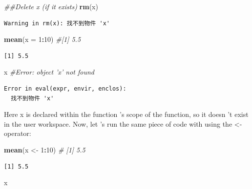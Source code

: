 \documentclass[]{book}
\newenvironment{Shaded}{\begin{snugshade}}{\end{snugshade}}
\newcommand{\CommentTok}[1]{\textcolor[rgb]{0.56,0.35,0.01}{\textit{#1}}}
\newcommand{\DataTypeTok}[1]{\textcolor[rgb]{0.13,0.29,0.53}{#1}}
\newcommand{\DecValTok}[1]{\textcolor[rgb]{0.00,0.00,0.81}{#1}}
\newcommand{\KeywordTok}[1]{\textcolor[rgb]{0.13,0.29,0.53}{\textbf{#1}}}
\newcommand{\NormalTok}[1]{#1}
\newcommand{\OperatorTok}[1]{\textcolor[rgb]{0.81,0.36,0.00}{\textbf{#1}}}
\newcommand{\StringTok}[1]{\textcolor[rgb]{0.31,0.60,0.02}{#1}}
\theoremstyle{definition}
\theoremstyle{definition}
\theoremstyle{definition}
\theoremstyle{remark}
\begin{document}
\begin{Shaded}
\begin{Highlighting}[]
\CommentTok{##Delete x (if it exists)}
\KeywordTok{rm}\NormalTok{(x)}
\end{Highlighting}
\end{Shaded}

\begin{verbatim}
Warning in rm(x): 找不到物件 'x'
\end{verbatim}

\begin{Shaded}
\begin{Highlighting}[]
\KeywordTok{mean}\NormalTok{(}\DataTypeTok{x =} \DecValTok{1}\OperatorTok{:}\DecValTok{10}\NormalTok{) }\CommentTok{#[1] 5.5}
\end{Highlighting}
\end{Shaded}

\begin{verbatim}
[1] 5.5
\end{verbatim}

\begin{Shaded}
\begin{Highlighting}[]
\NormalTok{x }\CommentTok{#Error: object 'x' not found}
\end{Highlighting}
\end{Shaded}

\begin{verbatim}
Error in eval(expr, envir, enclos):
  找不到物件 'x'
\end{verbatim}

Here x is declared within the function 's scope of the function, so it
doesn 't exist in the user workspace. Now, let 's run the same piece of
code with using the \textless{}- operator:

\begin{Shaded}
\begin{Highlighting}[]
\KeywordTok{mean}\NormalTok{(x <-}\StringTok{ }\DecValTok{1}\OperatorTok{:}\DecValTok{10}\NormalTok{) }\CommentTok{# [1] 5.5}
\end{Highlighting}
\end{Shaded}

\begin{verbatim}
[1] 5.5
\end{verbatim}

\begin{Shaded}
\begin{Highlighting}[]
\NormalTok{x}
\end{Highlighting}
\end{Shaded}
\end{document}
